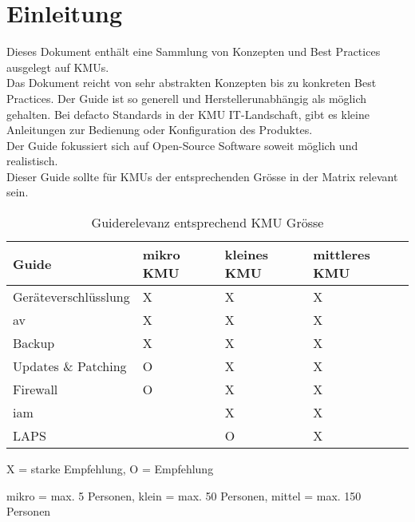 \chapter{Einleitung}
Dieses Dokument enthält eine Sammlung von Konzepten und Best Practices ausgelegt auf KMUs.\\

Das Dokument reicht von sehr abstrakten Konzepten bis zu konkreten Best Practices.
Der Guide ist so generell und Herstellerunabhängig als möglich gehalten.
Bei defacto Standards in der KMU IT-Landschaft, gibt es kleine Anleitungen zur Bedienung oder Konfiguration des Produktes.\\

Der Guide fokussiert sich auf Open-Source Software soweit möglich und realistisch.\\

Dieser Guide sollte für KMUs der entsprechenden Grösse in der Matrix relevant sein.

\begin{table}[H]
    \begin{center}
        \begin{tabular}{l|l|l|l}
            Guide                & mikro KMU & kleines KMU & mittleres KMU\\
            \hline
            Geräteverschlüsslung & X         & X             & X\\
            \acrlong{av}         & X         & X             & X\\
            Backup               & X         & X             & X\\
            Updates \& Patching  & O         & X             & X\\
            Firewall             & O         & X             & X\\
            \acrshort{iam}       &           & X             & X\\
            LAPS                 &           & O             & X\\
        \end{tabular}
        \caption*{X = starke Empfehlung, O = Empfehlung}
        \vspace{-3mm}
        \caption*{mikro = max. 5 Personen, klein = max. 50 Personen, mittel = max. 150 Personen}
    \end{center}
    \caption{Guiderelevanz entsprechend KMU Grösse}
\end{table}